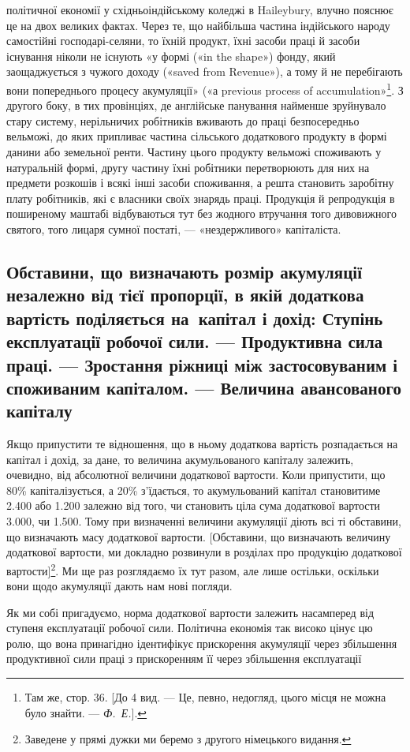\parcont{}  %
політичної економії у східньоіндійському коледжі в Haileybury,
влучно пояснює це на двох великих фактах. Через те, що
найбільша частина індійського народу самостійні господарі-селяни,
то їхній продукт, їхні засоби праці й засоби існування
ніколи не існують «у формі («in the shape») фонду, який заощаджується
з чужого доходу («saved from Revenue»), а тому
й не перебігають вони попереднього процесу акумуляції» («а
previous process of accumulation»\footnote{
Там же, стор. 36. [До 4 вид. — Це, певно, недогляд, цього місця
не можна було знайти. — \emph{Ф.~Е.}].
}. З другого боку, в тих провінціях,
де англійське панування найменше зруйнувало стару
систему, нерільничих робітників вживають до праці безпосередньо
вельможі, до яких припливає частина сільського додаткового продукту
в формі данини або земельної ренти. Частину цього продукту
вельможі споживають у натуральній формі, другу частину
їхні робітники перетворюють для них на предмети розкошів
і всякі інші засоби споживання, а решта становить заробітну
плату робітників, які є власники своїх знарядь праці. Продукція
й репродукція в поширеному маштабі відбуваються тут без
жодного втручання того дивовижного святого, того лицаря сумної
постаті, — «нездержливого» капіталіста.

\subsection{Обставини, що визначають розмір акумуляції незалежно від
тієї пропорції, в якій додаткова вартість поділяється на~капітал
і дохід: Ступінь експлуатації робочої сили. — Продуктивна
сила праці. — Зростання ріжниці між застосовуваним і споживаним
капіталом. — Величина авансованого капіталу}

Якщо припустити те відношення, що в ньому додаткова вартість
розпадається на капітал і дохід, за дане, то величина акумульованого
капіталу залежить, очевидно, від абсолютної величини
додаткової вартости. Коли припустити, що 80\% капіталізується,
а 20\% з’їдається, то акумульований капітал становитиме
\num{2.400} або \num{1.200} залежно
від того, чи становить ціла сума додаткової вартости \num{3.000}, чи \num{1.500}. Тому при визначенні
величини акумуляції діють всі ті обставини, що визначають масу
додаткової вартости. [Обставини, що визначають величину додаткової
вартости, ми докладно розвинули в розділах про продукцію
додаткової вартости]\footnote*{
Заведене у прямі дужки ми беремо з другого німецького видання.
}. Ми ще раз розглядаємо їх тут
разом, але лише остільки, оскільки вони щодо акумуляції дають
нам нові погляди.

Як ми собі пригадуємо, норма додаткової вартости залежить
насамперед від ступеня експлуатації робочої сили. Політична
економія так високо цінує цю ролю, що вона принагідно ідентифікує
прискорення акумуляції через збільшення продуктивної
сили праці з прискоренням її через збільшення експлуатації
\parbreak{}  %
